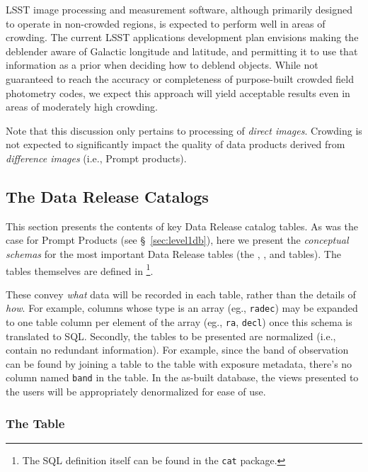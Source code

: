 LSST image processing and measurement software, although primarily designed to operate in non-crowded regions, is expected to perform well in areas of crowding. The current LSST applications development plan envisions making the deblender aware of Galactic longitude and latitude, and permitting it to use that information as a prior when deciding how to deblend objects. While not guaranteed to reach the accuracy or completeness of purpose-built crowded field photometry codes, we expect this approach will yield acceptable results even in areas of moderately high crowding.

Note that this discussion only pertains to processing of \emph{direct images}. Crowding is not expected to significantly impact the quality of data products derived from \emph{difference images} (i.e., Prompt products).

\subsection{The Data Release Catalogs}

This section presents the contents of key Data Release catalog tables. As was the case for Prompt Products (see \S~\ref{sec:level1db}), here we present the \emph{conceptual schemas} for the most important Data Release tables (the \Object, \Source, and \ForcedSource tables).
The tables themselves are defined in \footnote{The SQL definition itself can be found in the \texttt{cat} package.}.

These convey \emph{what} data will be recorded in each table, rather than the details of \emph{how}. For example, columns whose type is an array (eg., \texttt{radec}) may be expanded to one table column per element of the array (eg., \texttt{ra}, \texttt{decl}) once this schema is translated to SQL. Secondly, the tables to be presented are normalized (i.e., contain no redundant information). For example, since the band of observation can be found by joining a \Source table to the table with exposure metadata, there's no column named \texttt{band} in the \Source table. In the as-built database, the views presented to the users will be appropriately denormalized for ease of use.

\subsubsection{The \Object Table}
\label{sec:objectTable}

